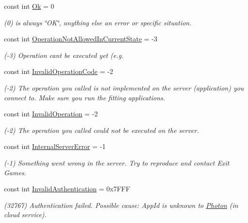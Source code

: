 \begin{DoxyCompactItemize}
\item 
const int \hyperlink{class_exit_games_1_1_client_1_1_photon_1_1_error_code_a22e4adab4389f1eea01c8bbcf3b6fbd8}{Ok} = 0
\begin{DoxyCompactList}\small\item\em (0) is always \char`\"{}\+O\+K\char`\"{}, anything else an error or specific situation.\end{DoxyCompactList}\item 
const int \hyperlink{class_exit_games_1_1_client_1_1_photon_1_1_error_code_a7a4b13bd9524022d433f5d70e1ae944a}{Operation\+Not\+Allowed\+In\+Current\+State} = -\/3
\begin{DoxyCompactList}\small\item\em (-\/3) Operation can\textquotesingle{}t be executed yet (e.\+g. \end{DoxyCompactList}\item 
const int \hyperlink{class_exit_games_1_1_client_1_1_photon_1_1_error_code_a8d0df840a8f536d2466ee21ad7b293b1}{Invalid\+Operation\+Code} = -\/2
\begin{DoxyCompactList}\small\item\em (-\/2) The operation you called is not implemented on the server (application) you connect to. Make sure you run the fitting applications.\end{DoxyCompactList}\item 
const int \hyperlink{class_exit_games_1_1_client_1_1_photon_1_1_error_code_a326bcb717b4766d05879e49c5f04ce5e}{Invalid\+Operation} = -\/2
\begin{DoxyCompactList}\small\item\em (-\/2) The operation you called could not be executed on the server. \end{DoxyCompactList}\item 
const int \hyperlink{class_exit_games_1_1_client_1_1_photon_1_1_error_code_a6ec548a4e26dcc59ce47e6f1230247b9}{Internal\+Server\+Error} = -\/1
\begin{DoxyCompactList}\small\item\em (-\/1) Something went wrong in the server. Try to reproduce and contact Exit Games.\end{DoxyCompactList}\item 
const int \hyperlink{class_exit_games_1_1_client_1_1_photon_1_1_error_code_a052f0ac657c546e750e91531393fa9c6}{Invalid\+Authentication} = 0x7\+F\+FF
\begin{DoxyCompactList}\small\item\em (32767) Authentication failed. Possible cause\+: App\+Id is unknown to \hyperlink{namespace_exit_games_1_1_client_1_1_photon}{Photon} (in cloud service).\end{DoxyCompactList}\item 

\end{DoxyCompactItemize}
